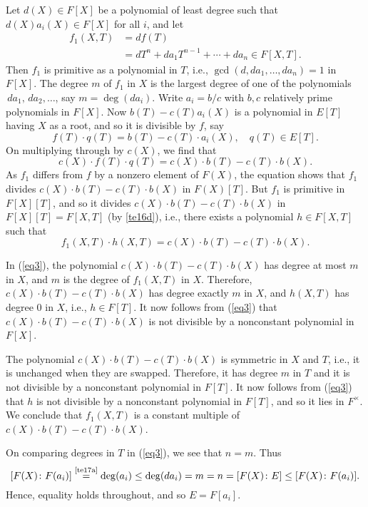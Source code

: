 \documentclass[a4paper,11pt,final,openany]{memoir}
\theoremstyle{nonumberplain}
\begin{document}
Let $d(X)\in F[X]$ be a polynomial of least degree such that $d(X)a_{i}(X)\in
F[X]$ for all $i$, and let%
\begin{align*}
  f_{1}(X,T)&=df(T)\\
  &=dT^{n}+da_{1}T^{n-1}+\cdots+da_{n}\in F[X,T].
\end{align*}
Then $f_{1}$ is primitive as a polynomial in $T$, i.e., $\gcd(d,da_{1}%
,\ldots,da_{n})=1$ in $F[X]$. The degree $m$ of $f_{1}$ in $X$ is the largest
degree of one of the polynomials $\,da_{1},\,da_{2},\ldots$, say
$m=\deg(da_{i})$. Write $a_{i}=b/c$ with $b,c$ relatively prime polynomials in
$F[X]$. Now $b(T)-c(T)a_{i}(X)$ is a polynomial in $E[T]$ having $X$ as a
root, and so it is divisible by $f$, say%
\[
f(T)\cdot q(T)=b(T)-c(T)\cdot a_{i}(X),\quad q(T)\in E[T]\text{.}%
\]
On multiplying through by $c(X)$, we find that%
\[
c(X)\cdot f(T)\cdot q(T)=c(X)\cdot b(T)-c(T)\cdot b(X).
\]
As $f_{1}$ differs from $f$ by a nonzero element of $F(X)$, the equation shows
that $f_{1}$ divides $c(X)\cdot b(T)-c(T)\cdot b(X)$ in $F(X)[T]$. But $f_{1}$
is primitive in $F[X][T]$, and so it divides $c(X)\cdot b(T)-c(T)\cdot b(X)$
in $F[X][T]=F[X,T]$ (by \ref{te16d}), i.e., there exists a polynomial $h\in
F[X,T]$ such that%
\begin{equation}
f_{1}(X,T)\cdot h(X,T)=c(X)\cdot b(T)-c(T)\cdot b(X)\text{.} \label{eq3}%
\end{equation}


In (\ref{eq3}), the polynomial $c(X)\cdot b(T)-c(T)\cdot b(X)$ has degree at
most $m$ in $X$, and $m$ is the degree of $f_{1}(X,T)$ in $X$. Therefore,
$c(X)\cdot b(T)-c(T)\cdot b(X)$ has degree exactly $m$ in $X$, and $h(X,T)$
has degree $0$ in $X$, i.e., $h\in F[T]$. It now follows from (\ref{eq3}) that
$c(X)\cdot b(T)-c(T)\cdot b(X)$ is not divisible by a nonconstant polynomial
in $F[X]$.

The polynomial $c(X)\cdot b(T)-c(T)\cdot b(X)$ is symmetric in $X$ and $T$,
i.e., it is unchanged when they are swapped. Therefore, it has degree $m$ in
$T$ and it is not divisible by a nonconstant polynomial in $F[T]$. It now
follows from (\ref{eq3}) that $h$ is not divisible by a nonconstant polynomial
in $F[T]$, and so it lies in $F^{\times}$. We conclude that $f_{1}(X,T)$ is a
constant multiple of $c(X)\cdot b(T)-c(T)\cdot b(X)$.

On comparing degrees in $T$ in (\ref{eq3}), we see that $n=m$. Thus%
\[
\lbrack F(X)\colon F(a_{i})]\overset{\text{\ref{te17a}}}{=}\deg(a_{i})\leq
\deg(da_{i})=m=n=[F(X)\colon E]\leq\lbrack F(X)\colon F(a_{i})].
\]
Hence, equality holds throughout, and so $E=F[a_{i}]$.
\end{document}
